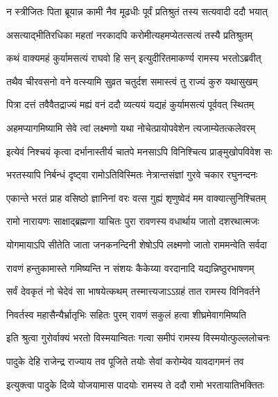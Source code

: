 
\twolineshloka
{न स्त्रीजितः पिता ब्रूयान्न कामी नैव मूढधीः}
{पूर्वं प्रतिश्रुतं तस्य सत्यवादी ददौ भयात्} %

\twolineshloka
{असत्याद्भीतिरधिका महतां नरकादपि}
{करोमीत्यहमप्येतत्सत्यं तस्यै प्रतिश्रुतम्} %

\twolineshloka
{कथं वाक्यमहं कुर्यामसत्यं राघवो हि सन्}
{इत्युदीरितमाकर्ण्य रामस्य भरतोऽब्रवीत्} %


\twolineshloka
{तथैव चीरवसनो वने वत्स्यामि सुव्रत}
{चतुर्दश समास्त्वं तु राज्यं कुरु यथासुखम्} %


\twolineshloka
{पित्रा दत्तं तवैवैतद्राज्यं मह्यं वनं ददौ}
{व्यत्ययं यद्यहं कुर्यामसत्यं पूर्ववत् स्थितम्} %

\twolineshloka
{अहमप्यागमिष्यामि सेवे त्वां लक्ष्मणो यथा}
{नोचेत्प्रायोपवेशेन त्यजाम्येतत्कलेवरम्} %

\twolineshloka
{इत्येवं निश्चयं कृत्वा दर्भानास्तीर्य चातपे}
{मनसाऽपि विनिश्चित्य प्राङ्मुखोपविवेश सः} %

\twolineshloka
{भरतस्यापि निर्बन्धं दृष्ट्वा रामोऽतिविस्मितः}
{नेत्रान्तसंज्ञां गुरवे चकार रघुनन्दनः} %

\twolineshloka
{एकान्ते भरतं प्राह वसिष्ठो ज्ञानिनां वरः}
{वत्स गुह्यं शृणुष्वेदं मम वाक्यात्सुनिश्चितम्} %

\twolineshloka
{रामो नारायणः साक्षाद्ब्रह्मणा याचितः पुरा}
{रावणस्य वधार्थाय जातो दशरथात्मजः} %

\twolineshloka
{योगमायाऽपि सीतेति जाता जनकनन्दिनी}
{शेषोऽपि लक्ष्मणो जातो राममन्वेति सर्वदा} %

\twolineshloka
{रावणं हन्तुकामास्ते गमिष्यन्ति न संशयः}
{कैकेय्या वरदानादि यद्यन्निष्ठुरभाषणम्} %

\twolineshloka
{सर्वं देवकृतं नो चेदेवं सा भाषयेत्कथम्}
{तस्मात्त्यजाऽऽग्रहं तात रामस्य विनिवर्तने} %

\twolineshloka
{निवर्तस्व महासैन्यैर्भ्रातृभिः सहितः पुरम्}
{रावणं सकुलं हत्वा शीघ्रमेवागमिष्यति} %

\twolineshloka
{इति श्रुत्वा गुरोर्वाक्यं भरतो विस्मयान्वितः}
{गत्वा समीपं रामस्य विस्मयोत्फुल्ललोचनः} %

\twolineshloka
{पादुके देहि राजेन्द्र राज्याय तव पूजिते}
{तयोः सेवां करोम्येव यावदागमनं तव} %

\twolineshloka
{इत्युक्त्वा पादुके दिव्ये योजयामास पादयोः}
{रामस्य ते ददौ रामो भरतायातिभक्तितः} %

